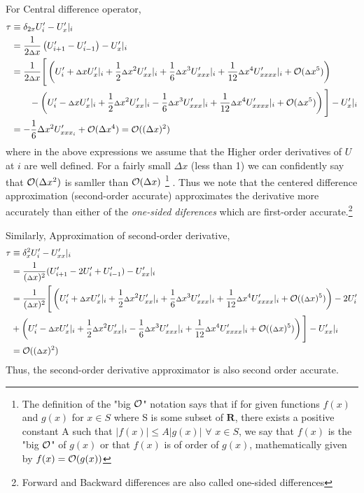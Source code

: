For Central difference operator,
\begin{align*}
    \tau &\equiv \delta _ {2x} U'_ i - {U'_ x}|_ i \\
    &= \frac{1}{{2 {\scriptstyle \Delta} } x}\left( U'_ {i+1} - U'_{i-1}\right) - {U'_ x}|_i \\
    &= \frac{1}{2 {\scriptstyle \Delta}  x}\Bigg[ \left( U'_ i + {\scriptstyle \Delta} x{U'_ x}|_ i + \frac{1}{2}{\scriptstyle \Delta} x^2{U'_{xx}}|_ i + \frac{1}{6}{\scriptstyle \Delta} x^3{U'_{xxx}}|_ i + \frac{1}{12}{\scriptstyle \Delta} x^4{U'_{xxxx}}|_ i + \mathcal{O}({\scriptstyle \Delta} x^5)\right) \\
    &\qquad - \left( U'_ i - {\scriptstyle \Delta} x{U'_ x}|_ i + \frac{1}{2}{\scriptstyle \Delta} x^2{U'_{xx}}|_ i - \frac{1}{6}{\scriptstyle \Delta} x^3{U'_{xxx}}|_ i + \frac{1}{12}{\scriptstyle \Delta} x^4{U'_{xxxx}}|_ i +\mathcal{O}({\scriptstyle \Delta} x^5)\right)\Bigg] - {U'_ x}|_ i \\
    &= -\frac{1}{6}\Delta x^2 U'_{xxx_ i} + \mathcal{O}(\Delta x^4) = \mathcal{O}((\Delta x)^2)
\end{align*}
where in the above expressions we assume that the Higher order derivatives of $U$ at $i$ are well defined. For a fairly small $\Delta x$ (less than 1) we can confidently say that $\mathcal{O}(\Delta x^2)$ is samller than $\mathcal{O}(\Delta x)$%
\footnote{The definition of the "big $\mathcal{O}$" notation says that if for given functions $f(x)$ and $g(x)$ for $x \in S$ where S is some subset of $\mathbf{R}$, there exists a positive constant A such that $|f(x)| \leq A|g(x)|$ $\forall$ $x \in S$, we say that $f(x)$ is the "big $\mathcal{O}$" of $g(x)$ or that $f(x)$ is of order of $g(x)$, mathematically given by $f(x) = \mathcal{O}(g(x))$}%
. Thus we note that the centered difference approximation (second-order accurate) approximates the derivative more accurately than either of the \textit{one-sided diferences} which are first-order accurate.\footnote{Forward and Backward differences are also called one-sided differences}

Similarly, Approximation of second-order derivative,
\begin{align*}
    \tau &\equiv \delta^2_x U'_i - U'_{xx}|_i \\
     &= \frac{1}{({\scriptstyle \Delta} x)^2}(U'_{i+1}-2 U'_i + U'_{i-1})  - U'_{xx}|_i \\
     &= \frac{1}{({\scriptstyle \Delta} x)^2}\Bigg[ \left( U'_ i + {\scriptstyle \Delta} x{U'_ x}|_ i + \frac{1}{2}{\scriptstyle \Delta} x^2{U'_{xx}}|_ i + \frac{1}{6}{\scriptstyle \Delta} x^3{U'_{xxx}}|_ i + \frac{1}{12}{\scriptstyle \Delta} x^4{U'_{xxxx}}|_ i + \mathcal{O}(({\scriptstyle \Delta} x)^5)\right) - 2 U'_i\\
    & + \left( U'_ i - {\scriptstyle \Delta} x{U'_ x}|_ i + \frac{1}{2}{\scriptstyle \Delta} x^2{U'_{xx}}|_ i - \frac{1}{6}{\scriptstyle \Delta} x^3{U'_{xxx}}|_ i + \frac{1}{12}{\scriptstyle \Delta} x^4{U'_{xxxx}}|_ i +\mathcal{O}(({\scriptstyle \Delta} x)^5)\right)\Bigg] - {U'_ {xx}}|_ i \\
    &= \mathcal{O}(({\scriptstyle \Delta} x)^2)
\end{align*}
Thus, the second-order derivative approximator is also second order accurate.

